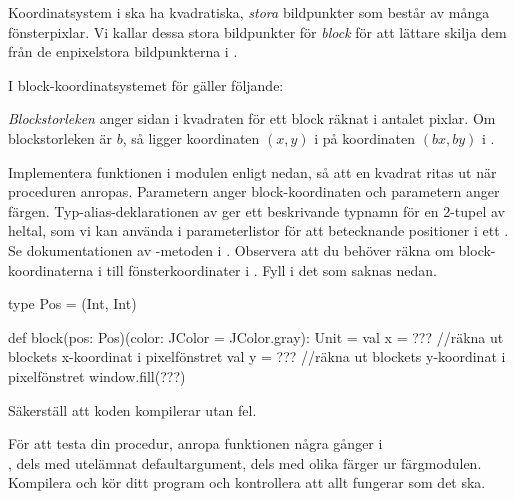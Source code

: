 \Subtask
Koordinatsystem i  ska ha kvadratiska, \emph{stora} bildpunkter som består av många fönsterpixlar. 
Vi kallar dessa stora bildpunkter för \emph{block} för att lättare skilja dem från de enpixelstora bildpunkterna i . 

I block-koordinatsystemet för  gäller följande:

\begin{framed}
\noindent \emph{Blockstorleken} anger sidan i kvadraten för ett block räknat i antalet pixlar. Om blockstorleken är $b$, så ligger koordinaten $(x, y)$ i  på koordinaten $(bx, by)$ i .

\end{framed}

\noindent Implementera funktionen  i modulen  enligt nedan, så att en kvadrat ritas ut när proceduren anropas. Parametern  anger block-koordinaten och parametern  anger färgen. Typ-alias-deklarationen av  ger ett beskrivande typnamn för en 2-tupel av heltal, som vi kan använda i parameterlistor för att betecknande positioner i ett . Se dokumentationen av -metoden i . Observera att du behöver räkna om block-koordinaterna i  till fönsterkoordinater i . Fyll i det som saknas nedan.
\begin{Code}
  type Pos = (Int, Int)

  def block(pos: Pos)(color: JColor = JColor.gray): Unit = 
    val x = ??? //räkna ut blockets x-koordinat i pixelfönstret
    val y = ??? //räkna ut blockets y-koordinat i pixelfönstret
    window.fill(???)
\end{Code}
Säkerställ att koden kompilerar utan fel.


\Subtask
För att testa din procedur, anropa funktionen  några gånger i  \\, dels med utelämnat defaultargument, dels med olika färger ur färgmodulen. Kompilera och kör ditt program och kontrollera att allt fungerar som det ska.



